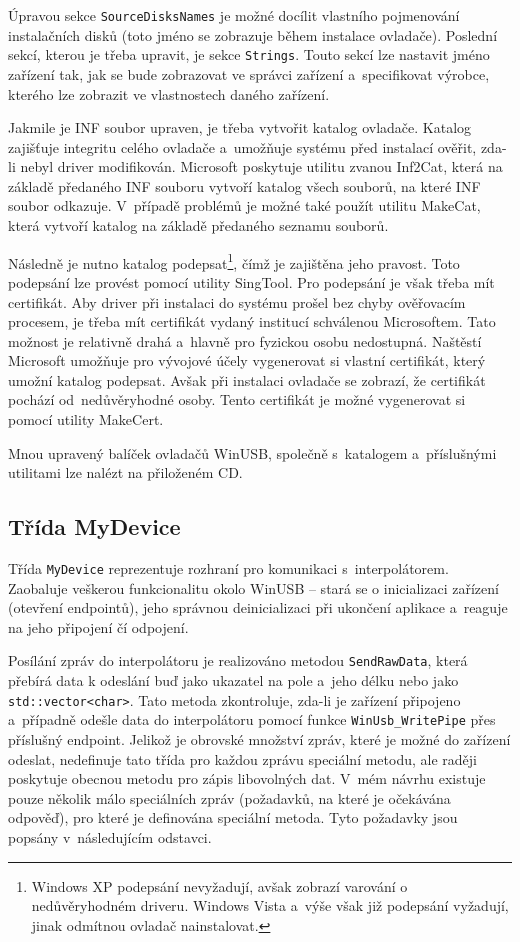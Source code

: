 		Úpravou sekce {\tt SourceDisksNames} je možné docílit vlastního pojmenování instalačních disků (toto jméno se zobrazuje během instalace ovladače). Poslední sekcí, kterou je třeba upravit, je sekce {\tt Strings}. Touto sekcí lze nastavit jméno zařízení tak, jak se bude zobrazovat ve správci zařízení a~specifikovat výrobce, kterého lze zobrazit ve vlastnostech daného zařízení.
		
		Jakmile je INF soubor upraven, je třeba vytvořit katalog ovladače\cite{kernel}. Katalog zajišťuje integritu celého ovladače a~umožňuje systému před instalací ověřit, zda-li nebyl driver modifikován. Microsoft poskytuje utilitu zvanou Inf2Cat\cite{kernel}, která na základě předaného INF souboru vytvoří katalog všech souborů, na které INF soubor odkazuje. V~případě problémů je možné také použít utilitu MakeCat\cite{kernel}, která vytvoří katalog na základě předaného seznamu souborů.
		
		Následně je nutno katalog podepsat\footnote{Windows XP podepsání nevyžadují, avšak zobrazí varování o nedůvěryhodném driveru. Windows Vista a~výše však již podepsání vyžadují, jinak odmítnou ovladač nainstalovat.}, čímž je zajištěna jeho pravost. Toto podepsání lze provést pomocí utility SingTool\cite{kernel}. Pro podepsání je však třeba mít certifikát. Aby driver při instalaci do systému prošel bez chyby ověřovacím procesem, je třeba mít certifikát vydaný institucí schválenou Microsoftem\cite{kernel}. Tato možnost je relativně drahá a~hlavně pro fyzickou osobu nedostupná. Naštěstí Microsoft umožňuje pro vývojové účely vygenerovat si vlastní certifikát, který umožní katalog podepsat\cite{kernel}. Avšak při instalaci ovladače se zobrazí, že certifikát pochází od~nedůvěryhodné osoby. Tento certifikát je možné vygenerovat si pomocí utility MakeCert\cite{kernel}.
		
		Mnou upravený balíček ovladačů WinUSB, společně s~katalogem a~příslušnými utilitami lze nalézt na přiloženém CD.
		
		\subsection{Třída MyDevice}
		
		Třída {\tt MyDevice} reprezentuje rozhraní pro komunikaci s~interpolátorem. Zaobaluje veškerou funkcionalitu okolo WinUSB -- stará se o inicializaci zařízení (otevření endpointů), jeho správnou deinicializaci při ukončení aplikace a~reaguje na jeho připojení čí odpojení.
		
		Posílání zpráv do interpolátoru je realizováno metodou {\tt SendRawData}, která přebírá data k odeslání buď jako ukazatel na pole a~jeho délku nebo jako {\tt std::vector<char>}. Tato metoda zkontroluje, zda-li je zařízení připojeno a~případně odešle data do interpolátoru pomocí funkce {\tt WinUsb\_WritePipe} přes příslušný endpoint. Jelikož je obrovské množství zpráv, které je možné do zařízení odeslat, nedefinuje tato třída pro každou zprávu speciální metodu, ale raději poskytuje obecnou metodu pro zápis libovolných dat. V~mém návrhu existuje pouze několik málo speciálních zpráv (požadavků, na které je očekávána odpověď), pro které je definována speciální metoda. Tyto požadavky jsou popsány v~následujícím odstavci.
		

